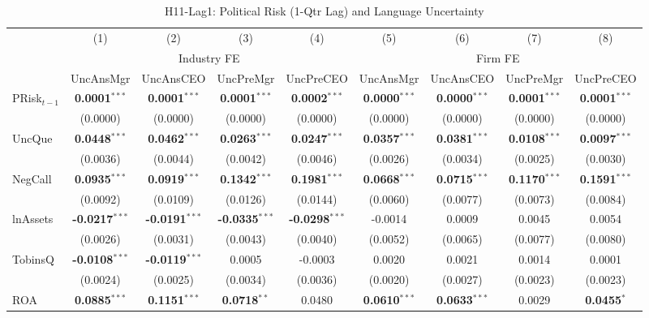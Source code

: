 \documentclass[11pt,a4paper]{article}
\begin{document}
\begin{table}[htbp]
\centering
\caption{H11-Lag1: Political Risk (1-Qtr Lag) and Language Uncertainty}
\label{tab:h11_lag1}
\scriptsize
\begin{tabular}{lcccccccc}
\toprule
 & (1) & (2) & (3) & (4) & (5) & (6) & (7) & (8) \\
 & \multicolumn{4}{c}{Industry FE} & \multicolumn{4}{c}{Firm FE} \\
\cmidrule(lr){2-5} \cmidrule(lr){6-9}
 & UncAnsMgr & UncAnsCEO & UncPreMgr & UncPreCEO & UncAnsMgr & UncAnsCEO & UncPreMgr & UncPreCEO \\
\midrule
PRisk$_{t-1}$ & \textbf{0.0001}$^{***}$ & \textbf{0.0001}$^{***}$ & \textbf{0.0001}$^{***}$ & \textbf{0.0002}$^{***}$ & \textbf{0.0000}$^{***}$ & \textbf{0.0000}$^{***}$ & \textbf{0.0001}$^{***}$ & \textbf{0.0001}$^{***}$ \\
 & (0.0000) & (0.0000) & (0.0000) & (0.0000) & (0.0000) & (0.0000) & (0.0000) & (0.0000) \\
\midrule
UncQue & \textbf{0.0448}$^{***}$ & \textbf{0.0462}$^{***}$ & \textbf{0.0263}$^{***}$ & \textbf{0.0247}$^{***}$ & \textbf{0.0357}$^{***}$ & \textbf{0.0381}$^{***}$ & \textbf{0.0108}$^{***}$ & \textbf{0.0097}$^{***}$ \\
 & (0.0036) & (0.0044) & (0.0042) & (0.0046) & (0.0026) & (0.0034) & (0.0025) & (0.0030) \\
NegCall & \textbf{0.0935}$^{***}$ & \textbf{0.0919}$^{***}$ & \textbf{0.1342}$^{***}$ & \textbf{0.1981}$^{***}$ & \textbf{0.0668}$^{***}$ & \textbf{0.0715}$^{***}$ & \textbf{0.1170}$^{***}$ & \textbf{0.1591}$^{***}$ \\
 & (0.0092) & (0.0109) & (0.0126) & (0.0144) & (0.0060) & (0.0077) & (0.0073) & (0.0084) \\
lnAssets & \textbf{-0.0217}$^{***}$ & \textbf{-0.0191}$^{***}$ & \textbf{-0.0335}$^{***}$ & \textbf{-0.0298}$^{***}$ & -0.0014 & 0.0009 & 0.0045 & 0.0054 \\
 & (0.0026) & (0.0031) & (0.0043) & (0.0040) & (0.0052) & (0.0065) & (0.0077) & (0.0080) \\
TobinsQ & \textbf{-0.0108}$^{***}$ & \textbf{-0.0119}$^{***}$ & 0.0005 & -0.0003 & 0.0020 & 0.0021 & 0.0014 & 0.0001 \\
 & (0.0024) & (0.0025) & (0.0034) & (0.0036) & (0.0020) & (0.0027) & (0.0023) & (0.0023) \\
ROA & \textbf{0.0885}$^{***}$ & \textbf{0.1151}$^{***}$ & \textbf{0.0718}$^{**}$ & 0.0480 & \textbf{0.0610}$^{***}$ & \textbf{0.0633}$^{***}$ & 0.0029 & \textbf{0.0455}$^{*}$ \\

\end{tabular}
\end{table}
\end{document}
